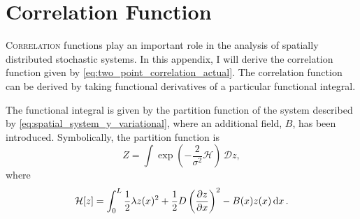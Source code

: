 \chapter{Correlation Function}
\label{appendix:correlation_function}

\lettrine[lines=3,loversize=0.1,findent=0.1em,nindent=0em]{C}{orrelation} functions play an important role in the analysis of spatially distributed stochastic systems.
In this appendix, I will derive the correlation function given by \cref{eq:two_point_correlation_actual}. The correlation function can be derived by taking functional
derivatives of a particular functional integral.

The functional integral is given by the partition function of the system described by \cref{eq:spatial_system_y_variational}, where an additional field, $B$, has been introduced. 
Symbolically, the partition function is
\begin{equation}
   \label{eq:path_integral}
   Z = \int \exp\left( -\frac{2}{\sigma^2} \mathcal{H} \right) \, \mathcal{D}z,
 \end{equation}
 where
 \begin{equation}
   \label{eq:hamiltonian}
   \mathcal{H}[z] = \int_0^L \frac{1}{2}\lambda z(x)^2 + \frac{1}{2}D\left(\pdv{z}{x}\right)^2 - B(x)z(x)\dd{x}.
 \end{equation}

